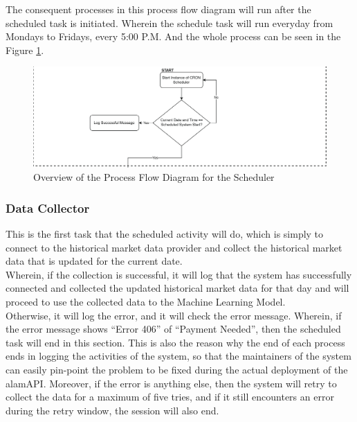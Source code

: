 The consequent processes in this process flow diagram will run after the 
scheduled task is initiated. Wherein the schedule task will run everyday from 
Mondays to Fridays, every 5:00 P.M. And the whole process can be seen in the 
Figure \ref{fig:process_flowchart_scheduler}.
\begin{figure}[ht]
    \centering
    \includegraphics[width=1\textwidth]{./assets/ProcessFlowchart-01.png}
    \caption{Overview of the Process Flow Diagram for the Scheduler}
    \label{fig:process_flowchart_scheduler}
\end{figure}
\FloatBarrier

\subsubsection{Data Collector}
\label{subsubsec:data_ollector}
This is the first task that the scheduled 
activity will do, which is simply to connect to the historical market 
data provider and collect the historical market data that is updated for 
the current date.
\hfill \\

Wherein, if the collection is successful, it will log that 
the system has successfully connected and collected the updated 
historical market data for that day and will proceed to use the 
collected data to the Machine Learning Model.
\hfill \\

Otherwise, it will log the error, and it will check the error message. 
Wherein, if the error message shows “Error 406” of “Payment Needed”, 
then the scheduled task will end in this section. This is also the reason why 
the end of each process ends in logging the activities of the system, so that 
the maintainers of the system can easily pin-point the problem to be fixed during 
the actual deployment of the alamAPI. Moreover, if the error is anything else, 
then the system will retry to collect the data for a maximum of five tries, and 
if it still encounters an error during the retry window, the session will also end.
\hfill \\

